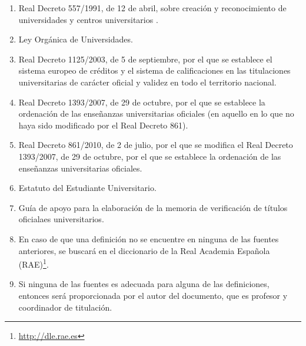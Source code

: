 \begin{enumerate}


    \item Real Decreto 557/1991, de 12 de abril, sobre creación y
        reconocimiento de universidades y centros universitarios
        \cite{rdUniversidadesPrivadas}.

    \item Ley Orgánica de Universidades\cite{leyUniversidades}.

    \item Real Decreto 1125/2003, de 5 de septiembre, por el que se establece
        el sistema europeo de créditos y el sistema de calificaciones en las
        titulaciones universitarias de carácter oficial y validez en todo el
        territorio nacional\cite{rdECTS}.

    \item Real Decreto 1393/2007, de 29 de octubre, por el que se establece
        la ordenación de las enseñanzas universitarias oficiales\cite{rd1393}
        (en aquello en lo que no haya sido modificado por el Real Decreto
        861\cite{rd861}).

    \item Real Decreto 861/2010, de 2 de julio, por el que se modifica el Real
        Decreto 1393/2007, de 29 de octubre, por el que se establece la
        ordenación de las enseñanzas universitarias oficiales\cite{rd861}.

    \item Estatuto del Estudiante Universitario\cite{estatutoEstudiante}.

    \item Guía de apoyo para la elaboración de la memoria de verificación
        de títulos oficialaes universitarios\cite{guiaAneca}.

    \item En caso de que una definición no se encuentre en ninguna de las
        fuentes anteriores, se buscará en el diccionario de la Real Academia
        Española (RAE)\footnote{\url{http://dle.rae.es}}.

    \item Si ninguna de las fuentes es adecuada para alguna de las
        definiciones, entonces será proporcionada por el autor del documento,
        que es profesor y coordinador de titulación.

\end{enumerate}

